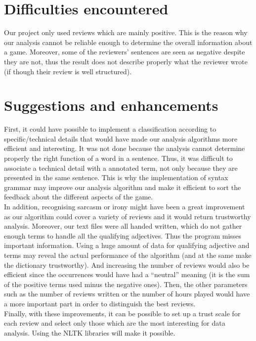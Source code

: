 \documentclass[paper=a4,fontsize=12pt]{report}
\begin{document}
\section{Difficulties encountered}
Our project only used reviews which are mainly positive. This is the reason why our analysis cannot be reliable enough to determine the overall information about a game. Moreover, some of the reviewers' sentences are seen as negative despite they are not, thus the result does not describe properly what the reviewer wrote (if though their review is well structured).   
\section{Suggestions and enhancements}
First, it could have possible to implement a classification according to specific/technical details that would have made our analysis algorithms more efficient and interesting. It was not done because the analysis cannot determine properly the right function of a word in a sentence. Thus, it was difficult to associate a technical detail with a annotated term, not only because they are presented in the same sentence. This is why the implementation of syntax grammar may improve our analysis algorithm and make it efficient to sort the feedback about the different aspects of the game.
\\
\linebreak
In addition, recognising sarcasm or irony might have been a great improvement as our algorithm could cover a variety of reviews and it would return trustworthy analysis. Moreover, our text files were all handed written, which do not gather enough terms to handle all the qualifying adjectives. Thus the program misses important information. Using a huge amount of data for qualifying adjective and terms may reveal the actual performance of the algorithm (and at the same make the dictionary trustworthy). And increasing the number of reviews would also be efficient since the occurrences would have had a "`neutral"' meaning (it is the sum of the positive terms used minus the negative ones). Then, the other parameters such as the number of reviews written or the number of hours played would have a more important part in order to distinguish the best reviews.
\\ \linebreak 
Finally, with these improvements, it can be possible to set up a trust scale for each review and select only those which are the most interesting for data analysis. Using the NLTK libraries will make it possible.
\end{document}
